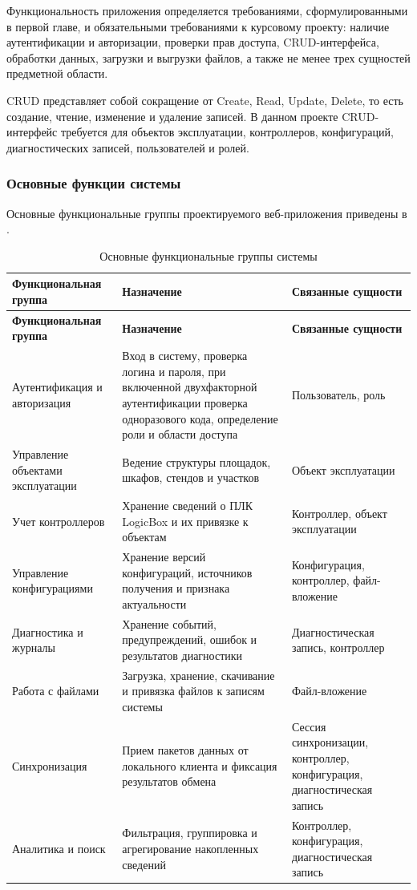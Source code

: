 Функциональность приложения определяется требованиями, сформулированными в первой главе, и обязательными требованиями к курсовому проекту: наличие аутентификации и авторизации, проверки прав доступа, CRUD-интерфейса, обработки данных, загрузки и выгрузки файлов, а также не менее трех сущностей предметной области.

CRUD представляет собой сокращение от Create, Read, Update, Delete, то есть создание, чтение, изменение и удаление записей. В данном проекте CRUD-интерфейс требуется для объектов эксплуатации, контроллеров, конфигураций, диагностических записей, пользователей и ролей.

\subsubsection{Основные функции системы}

Основные функциональные группы проектируемого веб-приложения приведены в .

\small
\begin{longtable}{|p{}|p{}|p{}|}
    \caption{Основные функциональные группы системы} \label{tab:function_groups2} \\
    \hline
    \textbf{Функциональная группа} & \textbf{Назначение} & \textbf{Связанные сущности} \\ \hline
    \endfirsthead
    \tabcont{\ref{tab:function_groups2}}
    \textbf{Функциональная группа} & \textbf{Назначение} & \textbf{Связанные сущности} \\ \hline
    \endhead
    \hline
    \endfoot
    \hline
    \endlastfoot
    Аутентификация и авторизация & Вход в систему, проверка логина и пароля, при включенной двухфакторной аутентификации проверка одноразового кода, определение роли и области доступа & Пользователь, роль \\ \hline
    Управление объектами эксплуатации & Ведение структуры площадок, шкафов, стендов и участков & Объект эксплуатации \\ \hline
    Учет контроллеров & Хранение сведений о ПЛК LogicBox и их привязке к объектам & Контроллер, объект эксплуатации \\ \hline
    Управление конфигурациями & Хранение версий конфигураций, источников получения и признака актуальности & Конфигурация, контроллер, файл-вложение \\ \hline
    Диагностика и журналы & Хранение событий, предупреждений, ошибок и результатов диагностики & Диагностическая запись, контроллер \\ \hline
    Работа с файлами & Загрузка, хранение, скачивание и привязка файлов к записям системы & Файл-вложение \\ \hline
    Синхронизация & Прием пакетов данных от локального клиента и фиксация результатов обмена & Сессия синхронизации, контроллер, конфигурация, диагностическая запись \\ \hline
    Аналитика и поиск & Фильтрация, группировка и агрегирование накопленных сведений & Контроллер, конфигурация, диагностическая запись \\ \hline
\end{longtable}
\normalsize

